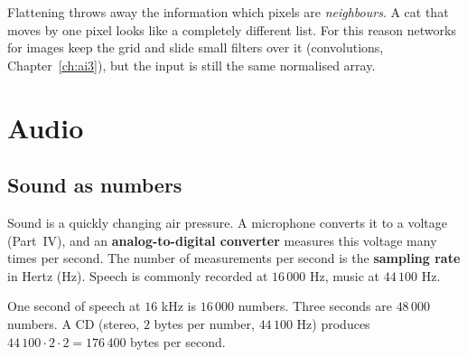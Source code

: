 \begin{center}
\label{fig:ai2_flat}
\end{center}

\begin{aibox}
Flattening throws away the information which pixels are \emph{neighbours}. A cat that moves by one pixel looks like a completely different list. For this reason networks for images keep the grid and slide small filters over it (convolutions, Chapter~\ref{ch:ai3}), but the input is still the same normalised array.
\end{aibox}

\section*{Audio}
\subsection*{Sound as numbers}
Sound is a quickly changing air pressure. A microphone converts it to a voltage (Part~IV), and an \textbf{analog-to-digital converter} measures this voltage many times per second. The number of measurements per second is the \textbf{sampling rate} in Hertz (Hz). Speech is commonly recorded at $16\,000$ Hz, music at $44\,100$ Hz.

\begin{example}
One second of speech at $16$ kHz is $16\,000$ numbers. Three seconds are $48\,000$ numbers. A CD (stereo, $2$ bytes per number, $44\,100$ Hz) produces $44\,100\cdot2\cdot2=176\,400$ bytes per second.
\end{example}

